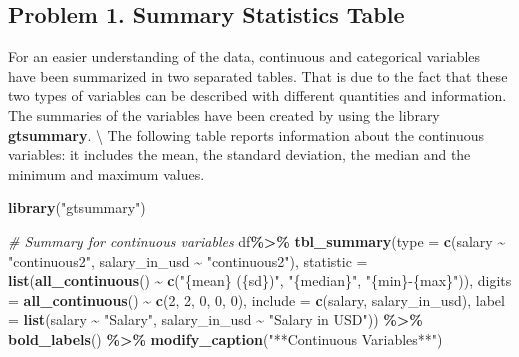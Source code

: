 \documentclass[
]{article}
\newenvironment{Shaded}{\begin{snugshade}}{\end{snugshade}}
\newcommand{\AttributeTok}[1]{\textcolor[rgb]{0.13,0.29,0.53}{#1}}
\newcommand{\CommentTok}[1]{\textcolor[rgb]{0.56,0.35,0.01}{\textit{#1}}}
\newcommand{\DecValTok}[1]{\textcolor[rgb]{0.00,0.00,0.81}{#1}}
\newcommand{\FunctionTok}[1]{\textcolor[rgb]{0.13,0.29,0.53}{\textbf{#1}}}
\newcommand{\NormalTok}[1]{#1}
\newcommand{\SpecialCharTok}[1]{\textcolor[rgb]{0.81,0.36,0.00}{\textbf{#1}}}
\newcommand{\StringTok}[1]{\textcolor[rgb]{0.31,0.60,0.02}{#1}}
\begin{document}
\hypertarget{problem-1.-summary-statistics-table}{%
\subsection{Problem 1. Summary Statistics
Table}\label{problem-1.-summary-statistics-table}}

For an easier understanding of the data, continuous and categorical
variables have been summarized in two separated tables. That is due to
the fact that these two types of variables can be described with
different quantities and information. The summaries of the variables
have been created by using the library \textbf{gtsummary}.
\textbackslash{} The following table reports information about the
continuous variables: it includes the mean, the standard deviation, the
median and the minimum and maximum values. \newline

\begin{Shaded}
\begin{Highlighting}[]
\FunctionTok{library}\NormalTok{(}\StringTok{"gtsummary"}\NormalTok{)}

\CommentTok{\# Summary for continuous variables}
\NormalTok{df}\SpecialCharTok{\%\textgreater{}\%} 
  \FunctionTok{tbl\_summary}\NormalTok{(}\AttributeTok{type =} \FunctionTok{c}\NormalTok{(salary }\SpecialCharTok{\textasciitilde{}} \StringTok{"continuous2"}\NormalTok{, salary\_in\_usd }\SpecialCharTok{\textasciitilde{}} \StringTok{"continuous2"}\NormalTok{), }
              \AttributeTok{statistic =} \FunctionTok{list}\NormalTok{(}\FunctionTok{all\_continuous}\NormalTok{() }\SpecialCharTok{\textasciitilde{}} \FunctionTok{c}\NormalTok{(}\StringTok{"\{mean\} (\{sd\})"}\NormalTok{, }
                                                    \StringTok{"\{median\}"}\NormalTok{, }\StringTok{"\{min\}{-}\{max\}"}\NormalTok{)),}
              \AttributeTok{digits =} \FunctionTok{all\_continuous}\NormalTok{() }\SpecialCharTok{\textasciitilde{}} \FunctionTok{c}\NormalTok{(}\DecValTok{2}\NormalTok{, }\DecValTok{2}\NormalTok{, }\DecValTok{0}\NormalTok{, }\DecValTok{0}\NormalTok{, }\DecValTok{0}\NormalTok{), }
              \AttributeTok{include =} \FunctionTok{c}\NormalTok{(salary, salary\_in\_usd),}
              \AttributeTok{label =} \FunctionTok{list}\NormalTok{(salary }\SpecialCharTok{\textasciitilde{}} \StringTok{"Salary"}\NormalTok{, salary\_in\_usd }\SpecialCharTok{\textasciitilde{}} \StringTok{"Salary in USD"}\NormalTok{)) }\SpecialCharTok{\%\textgreater{}\%}
  \FunctionTok{bold\_labels}\NormalTok{() }\SpecialCharTok{\%\textgreater{}\%}
  \FunctionTok{modify\_caption}\NormalTok{(}\StringTok{"**Continuous Variables**"}\NormalTok{)}
\end{Highlighting}
\end{Shaded}
\end{document}
